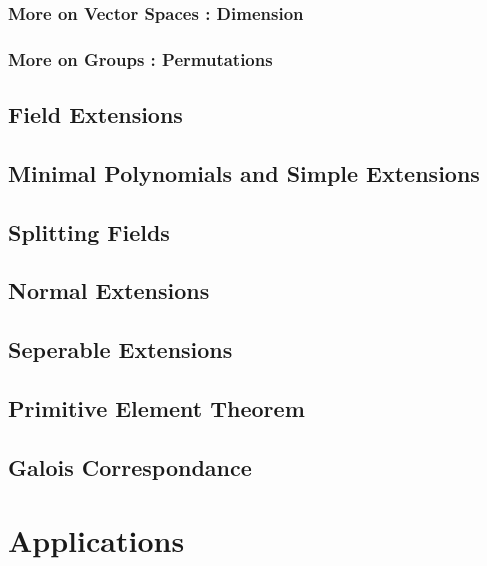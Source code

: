 \documentclass[oneside]{book}
\theoremstyle{lemmastyle}
\theoremstyle{definitionstyle}
\theoremstyle{exercisestyle}
\theoremstyle{claimstyle}
\newcommand{\<}{\langle}
\renewcommand{\>}{\rangle}
\begin{document}
        \section{More on Vector Spaces : Dimension}
            
        
        \section{More on Groups : Permutations}

    \chapter{Field Extensions}
        

    \chapter{Minimal Polynomials and Simple Extensions}
        

    \chapter{Splitting Fields}
        

    \chapter{Normal Extensions}
        

    \chapter{Seperable Extensions}
        
        
    \chapter{Primitive Element Theorem}
        

    \chapter{Galois Correspondance}
        
        
\part{Applications}
    
\end{document}
